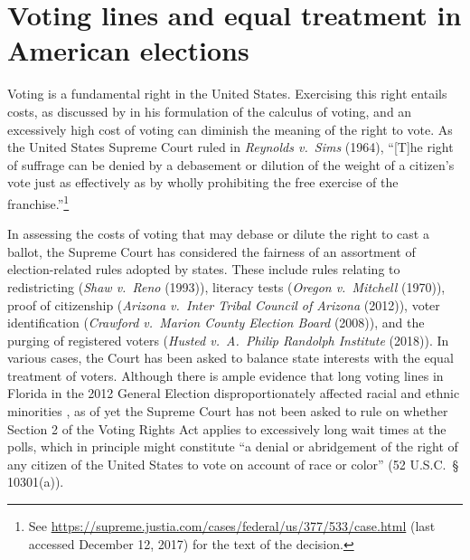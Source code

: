 \documentclass[12pt,titlepage]{article}
\begin{document}
\section*{Voting lines and equal treatment in American elections}

Voting is a fundamental right in the United States.  Exercising this
right entails costs, as discussed by \cite{downs:econtheory} in his
formulation of the calculus of voting, and an excessively high cost of
voting can diminish the meaning of the right to vote.  As the United
States Supreme Court ruled in \emph{Reynolds v.\ Sims} (1964), ``[T]he
right of suffrage can be denied by a debasement or dilution of the
weight of a citizen's vote just as effectively as by wholly
prohibiting the free exercise of the franchise.''\footnote{See
  \url{https://supreme.justia.com/cases/federal/us/377/533/case.html}
  (last accessed December 12, 2017) for the text of the decision.}

In assessing the costs of voting that may debase or dilute the right
to cast a ballot, the Supreme Court has considered the fairness of an
assortment of election-related rules adopted by states.  These include
rules relating to redistricting (\emph{Shaw v.\ Reno} (1993)),
literacy tests (\emph{Oregon v.\ Mitchell} (1970)), proof of
citizenship (\emph{Arizona v.\ Inter Tribal Council of Arizona}
(2012)), voter identification (\emph{Crawford v.\ Marion County
  Election Board} (2008)), and the purging of registered voters
(\emph{Husted v.\ A.\ Philip Randolph Institute} (2018)). In various
cases, the Court has been asked to balance state interests with the
equal treatment of voters.  Although there is ample evidence that long
voting lines in Florida in the 2012 General Election
disproportionately affected racial and ethnic minorities
\citep{herron_smith2014}, as of yet the Supreme Court has not been
asked to rule on whether Section 2 of the Voting Rights Act applies to
excessively long wait times at the polls, which in principle might
constitute ``a denial or abridgement of the right of any citizen of
the United States to vote on account of race or color'' (52 U.S.C.\ \S
10301(a)).
\end{document}
